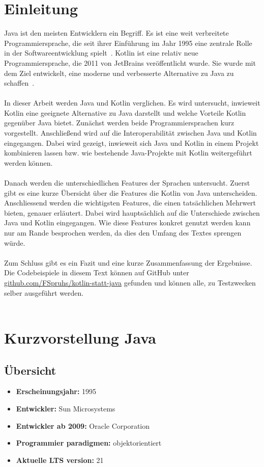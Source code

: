 \documentclass[11pt]{article}
\begin{document}
    \section{Einleitung}
    Java ist den meisten Entwicklern ein Begriff.
    Es ist eine weit verbreitete Programmiersprache, die seit ihrer Einführung im Jahr 1995 eine zentrale Rolle in der Softwareentwicklung spielt~\cite[54]{insel}.
    Kotlin ist eine relativ neue Programmiersprache, die 2011 von JetBrains veröffentlicht wurde.
    Sie wurde mit dem Ziel entwickelt, eine moderne und verbesserte Alternative zu Java zu schaffen~\cite[19]{kotlin-handbuch}.\\
    \\
    In dieser Arbeit werden Java und Kotlin verglichen.
    Es wird untersucht, inwieweit Kotlin eine geeignete Alternative zu Java darstellt und welche Vorteile Kotlin gegenüber Java bietet.
    Zunächst werden beide Programmiersprachen kurz vorgestellt.
    Anschließend wird auf die Interoperabilität zwischen Java und Kotlin eingegangen.
    Dabei wird gezeigt, inwieweit sich Java und Kotlin in einem Projekt kombinieren lassen bzw. wie bestehende Java-Projekte mit Kotlin weitergeführt werden können.\\
    \\
    Danach werden die unterschiedlichen Features der Sprachen untersucht.
    Zuerst gibt es eine kurze Übersicht über die Features die Kotlin von Java unterscheiden.
    Anschliessend werden die wichtigsten Features, die einen tatsächlichen Mehrwert bieten, genauer erläutert.
    Dabei wird hauptsächlich auf die Unterschiede zwischen Java und Kotlin eingegangen.
    Wie diese Features konkret genutzt werden kann nur am Rande besprochen werden, da dies den Umfang des Textes sprengen würde.\\
    \\
    Zum Schluss gibt es ein Fazit und eine kurze Zusammenfassung der Ergebnisse.
    Die Codebeispiele in diesem Text können auf GitHub unter \url{github.com/FSpruhs/kotlin-statt-java} gefunden und können alle, zu Testzwecken selber ausgeführt werden.\\
    \\
    \section{Kurzvorstellung Java}

    \subsection{Übersicht}
    \begin{itemize}
        \item \textbf{Erscheinungsjahr:} 1995
        \item \textbf{Entwickler:} Sun Microsystems
        \item \textbf{Entwickler ab 2009:} Oracle Corporation
        \item \textbf{Programmier paradigmen:} objektorientiert
        \item \textbf{Aktuelle LTS version:} 21
    \end{itemize}
\end{document}
